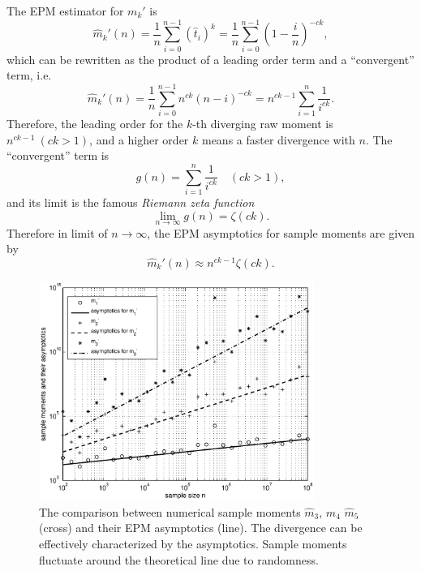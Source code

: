 The EPM estimator for $ m_k' $ is 
\[ \hat{m}_k'(n) = \frac{1}{n} \sum_{i=0}^{n-1} (\hat{t}_i)^k = \frac{1}{n} \sum_{i=0}^{n-1} (1-\frac{i}{n})^{-ck},\]
which can be rewritten as the product of a leading order term and a ``convergent'' term, i.e.
\begin{equation}
\hat{m}_k'(n) = \frac{1}{n} \sum_{i=0}^{n-1} n^{ck} (n-i)^{-ck} = n^{ck-1} \sum_{i=1}^n \frac{1}{i^{ck}}.
\end{equation}
Therefore, the leading order for the $ k $-th diverging raw moment is $ n^{ck-1} \ (ck>1)$, and a higher order $ k $ means a faster divergence with $ n $.  The ``convergent'' term is 
\begin{equation}
g(n) = \sum_{i=1}^n \frac{1}{i^{ck}} \quad (ck>1),
\end{equation}
and its limit is the famous \textit{Riemann zeta function}
\begin{equation}
\lim_{n \rightarrow \infty} g(n) = \zeta(ck).
\end{equation}
Therefore in limit of $ n \rightarrow \infty $, the EPM asymptotics for sample moments are given by
\begin{equation}
\hat{m}_{k}'(n) \approx n^{ck-1} \zeta(ck).
\end{equation}

\begin{figure}[!h]
\begin{center}
\includegraphics[width=0.8\textwidth]{figures/ch2_powerlaw_asymptotics.eps}
\caption{The comparison between numerical sample moments $ \hat{m}_3 $, $ \hat{m}_4 $ $ \hat{m}_5 $ (cross) and their EPM asymptotics (line). The divergence can be effectively characterized by the asymptotics. Sample moments fluctuate around the theoretical line due to randomness.}
\label{fig:ch2_powerlaw_asymptotics}
\end{center}
\end{figure}

